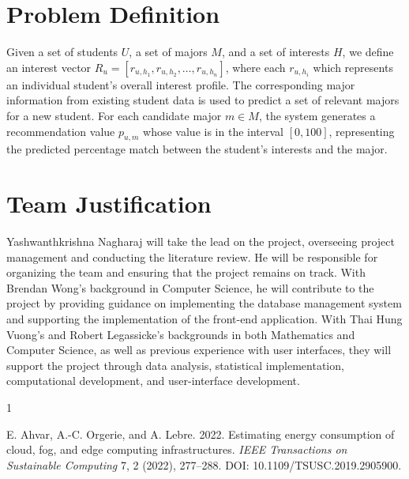 \documentclass[sigconf]{acmart}
\begin{document}

\section{Problem Definition}

Given a set of students $U$, a set of majors $M$, and a set of interests $H$, we define an interest vector \(R_u = [r_{u,h_1}, r_{u,h_2}, \ldots, r_{u,h_n}]\), where each \(r_{u,h_i}\) which represents an individual student's overall interest profile. The corresponding major information from existing student data is used to predict a set of relevant majors for a new student. For each candidate major $m \in M$, the system generates a recommendation value $p_{u,m}$ whose value is in the interval $[0,100]$, representing the predicted percentage match between the student's interests and the major.


\section{Team Justification}

Yashwanthkrishna Nagharaj will take the lead on the project, overseeing project management and conducting the literature review. He will be responsible for organizing the team and ensuring that the project remains on track. With Brendan Wong's background in Computer Science, he will contribute to the project by providing guidance on implementing the database management system and supporting the implementation of the front-end application. With Thai Hung Vuong's and Robert Legassicke's backgrounds in both Mathematics and Computer Science, as well as previous experience with user interfaces, they will support the project through data analysis, statistical implementation, computational development, and user-interface development.


\begin{thebibliography}{1}

E. Ahvar, A.-C. Orgerie, and A. Lebre.
2022.
Estimating energy consumption of cloud, fog, and edge computing infrastructures.
\textit{IEEE Transactions on Sustainable Computing} 7, 2 (2022), 277--288.
DOI: 10.1109/TSUSC.2019.2905900.

\end{thebibliography}
\end{document}
